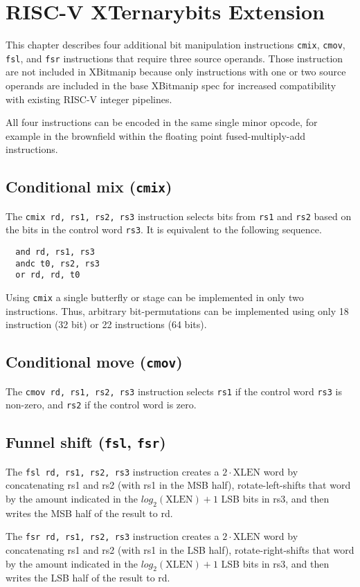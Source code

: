 \chapter{RISC-V XTernarybits Extension}
\label{tbits}

This chapter describes four additional bit manipulation instructions {\tt cmix}, {\tt cmov},
{\tt fsl}, and {\tt fsr} instructions that require three source operands. Those instruction
are not included in XBitmanip because only instructions with one or two source operands are
included in the base XBitmanip spec for increased compatibility with existing RISC-V integer
pipelines.

All four instructions can be encoded in the same single minor opcode, for example in the
brownfield within the floating point fused-multiply-add instructions.

\section{Conditional mix ({\tt cmix})}

The {\tt cmix rd, rs1, rs2, rs3} instruction selects bits from {\tt rs1} and {\tt rs2} based
on the bits in the control word {\tt rs3}. It is equivalent to the following sequence.

\begin{verbatim}
  and rd, rs1, rs3
  andc t0, rs2, rs3
  or rd, rd, t0
\end{verbatim}

Using {\tt cmix} a single butterfly or stage can be implemented in only two
instructions. Thus, arbitrary bit-permutations can be implemented using only
18 instruction (32 bit) or 22 instructions (64 bits).



\section{Conditional move ({\tt cmov})}

The {\tt cmov rd, rs1, rs2, rs3} instruction selects {\tt rs1} if the control
word {\tt rs3} is non-zero, and {\tt rs2} if the control word is zero.



\section{Funnel shift ({\tt fsl}, {\tt fsr})}

The {\tt fsl rd, rs1, rs2, rs3} instruction creates a $2\cdot\textrm{XLEN}$ word
by concatenating rs1 and rs2 (with rs1 in the MSB half), rotate-left-shifts that
word by the amount indicated in the $log_2(\textrm{XLEN})+1$ LSB bits in rs3, and
then writes the MSB half of the result to rd.

The {\tt fsr rd, rs1, rs2, rs3} instruction creates a $2\cdot\textrm{XLEN}$ word
by concatenating rs1 and rs2 (with rs1 in the LSB half), rotate-right-shifts that
word by the amount indicated in the $log_2(\textrm{XLEN})+1$ LSB bits in rs3, and
then writes the LSB half of the result to rd.




